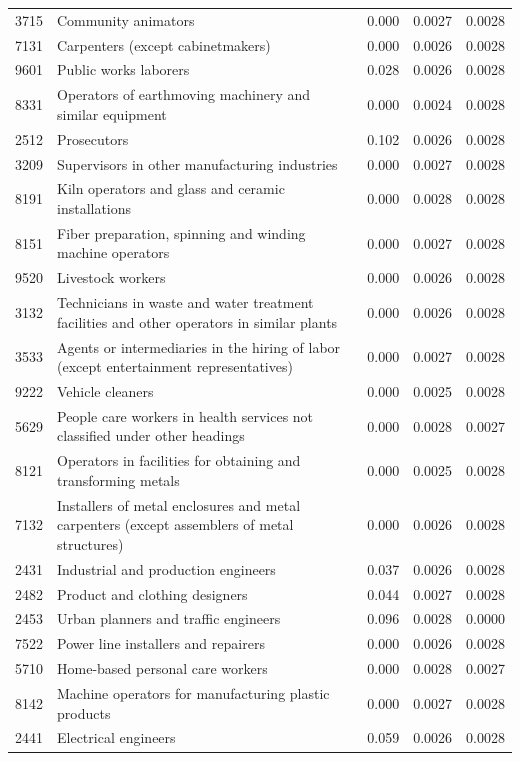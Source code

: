 \begin{longtable}{p{}>{\raggedright\arraybackslash}p{}rrr}
3715 & Community animators & 0.000 & 0.0027 & 0.0028 \\
7131 & Carpenters (except cabinetmakers) & 0.000 & 0.0026 & 0.0028 \\
9601 & Public works laborers & 0.028 & 0.0026 & 0.0028 \\
8331 & Operators of earthmoving machinery and similar equipment & 0.000 & 0.0024 & 0.0028 \\
2512 & Prosecutors & 0.102 & 0.0026 & 0.0028 \\
3209 & Supervisors in other manufacturing industries & 0.000 & 0.0027 & 0.0028 \\
8191 & Kiln operators and glass and ceramic installations & 0.000 & 0.0028 & 0.0028 \\
8151 & Fiber preparation, spinning and winding machine operators & 0.000 & 0.0027 & 0.0028 \\
9520 & Livestock workers & 0.000 & 0.0026 & 0.0028 \\
3132 & Technicians in waste and water treatment facilities and other operators in similar plants & 0.000 & 0.0026 & 0.0028 \\
3533 & Agents or intermediaries in the hiring of labor (except entertainment representatives) & 0.000 & 0.0027 & 0.0028 \\
9222 & Vehicle cleaners & 0.000 & 0.0025 & 0.0028 \\
5629 & People care workers in health services not classified under other headings & 0.000 & 0.0028 & 0.0027 \\
8121 & Operators in facilities for obtaining and transforming metals & 0.000 & 0.0025 & 0.0028 \\
7132 & Installers of metal enclosures and metal carpenters (except assemblers of metal structures) & 0.000 & 0.0026 & 0.0028 \\
2431 & Industrial and production engineers & 0.037 & 0.0026 & 0.0028 \\
2482 & Product and clothing designers & 0.044 & 0.0027 & 0.0028 \\
2453 & Urban planners and traffic engineers & 0.096 & 0.0028 & 0.0000 \\
7522 & Power line installers and repairers & 0.000 & 0.0026 & 0.0028 \\
5710 & Home-based personal care workers & 0.000 & 0.0028 & 0.0027 \\
8142 & Machine operators for manufacturing plastic products & 0.000 & 0.0027 & 0.0028 \\
2441 & Electrical engineers & 0.059 & 0.0026 & 0.0028 \\

\end{longtable}
